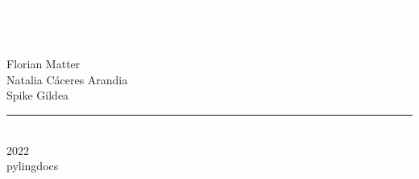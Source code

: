 \begin{titlingpage}
\BgThispage
{}
\vspace*{2cm}
\centering
\textcolor{white}{ \hugefont A digital sketch grammar of Yawarana }
\raggedleft
\vspace*{1cm}\par

\textcolor{white}{ \large 0.0.3.draft2 }

\vspace*{2cm}\par
\noindent
{
\begin{minipage}{0.90\linewidth}
    \begin{flushright}
        
{\Huge Florian Matter }\\[\baselineskip]

{\Huge Natalia Cáceres Arandia }\\[\baselineskip]

{\Huge Spike Gildea }\\[\baselineskip]

    \end{flushright}
\end{minipage} \hspace{15pt}
}
\centering
\vfill
\rule{0.4\textwidth}{0.4pt}\\
{\Huge 2022 \\ \large pylingdocs }
\end{titlingpage}
